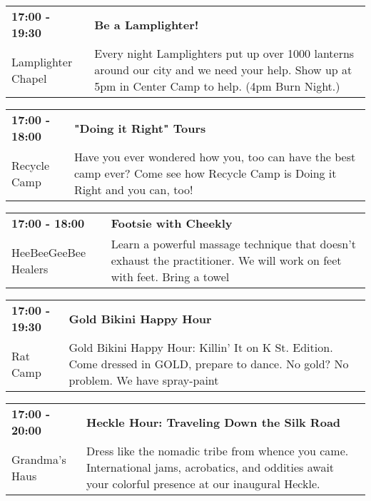 \begin{tabular}{ p{1in} p{2.2in} }
    \textbf{17:00 - 19:30} & \textbf{Be a Lamplighter!} \\
    Lamplighter Chapel \newline  & Every night Lamplighters put up over 1000 lanterns around our city and we need your help. Show up at 5pm in Center Camp to help. (4pm Burn Night.) \\
    \hline 
\end{tabular}
    
\begin{tabular}{ p{1in} p{2.2in} }
    \textbf{17:00 - 18:00} & \textbf{"Doing it Right" Tours} \\
    Recycle Camp \newline  & Have you ever wondered how you, too can have the best camp ever? Come see how Recycle Camp is Doing it Right and you can, too! \\
    \hline 
\end{tabular}
    
\begin{tabular}{ p{1in} p{2.2in} }
    \textbf{17:00 - 18:00} & \textbf{Footsie with Cheekly} \\
    HeeBeeGeeBee Healers \newline  & Learn a powerful massage technique that doesn't exhaust the practitioner. We will work on feet with feet. Bring a towel \\
    \hline 
\end{tabular}
    
\begin{tabular}{ p{1in} p{2.2in} }
    \textbf{17:00 - 19:30} & \textbf{Gold Bikini Happy Hour} \\
    Rat Camp \newline  & Gold Bikini Happy Hour: Killin' It on K St. Edition. Come dressed in GOLD, prepare to dance. No gold? No problem. We have spray-paint \\
    \hline 
\end{tabular}
    
\begin{tabular}{ p{1in} p{2.2in} }
    \textbf{17:00 - 20:00} & \textbf{Heckle Hour: Traveling Down the Silk Road} \\
    Grandma's Haus \newline  & Dress like the nomadic tribe from whence you came. International jams, acrobatics, and oddities await your colorful presence at our inaugural Heckle. \\
    \hline 
\end{tabular}
    
